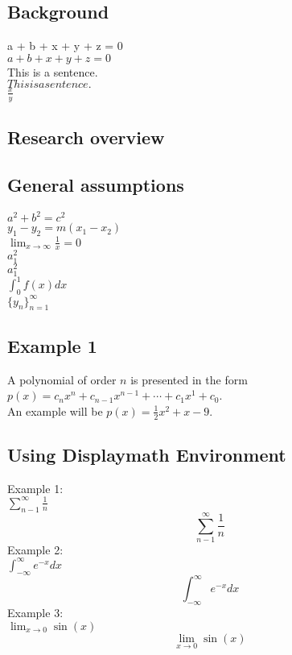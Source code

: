 \documentclass[12pt, a4paper]{article}
\begin{document}
\subsection{Background }
a + b + x + y + z = 0\\
$a + b + x + y + z = 0$\\
\newline
This is a sentence.\\
$This is a sentence.$\\
\newline
$\frac{x}{y}$

\subsection{Research overview}
\subsection{General assumptions}
$a^2 + b^2 = c^2$\\
\newline
$y_1-y_2 = m(x_1-x_2)$\\
\newline
$\lim_{x \to \infty} \frac{1}{x} = 0$\\
\newline
$a_1^2$\\
\newline
$a^2_1$\\
\newline
$\int_0^1 f(x) dx$\\
\newline
$\{y_n\}_{n=1}^\infty$
\subsection*{Example 1}
A polynomial of order $n$ is presented in the form 
$p(x) = c_n x^n + c_{n-1} x^{n-1} + \cdots + c_1 x^1 + c_0$. \\
An example will be $p(x) = \frac{1}{2}x^2 + x- 9$.

\subsection*{Using Displaymath Environment}
Example 1:\\
$\sum_{n-1}^\infty\frac{1}{n}$
\[\sum_{n-1}^\infty\frac{1}{n}\]
Example 2:\\
$\int_{-\infty}^\infty e^{-x}dx$
\[\int_{-\infty}^\infty e^{-x}dx\]
Example 3:\\
$\lim_{x\rightarrow 0}\sin(x)$
\[\lim_{x\to 0}\sin(x)\]
\end{document}
